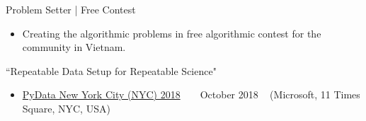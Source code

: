\begin{talks}

     \talk
	{Problem Setter | Free Contest}
	{
	\begin{itemize}[leftmargin=.4in]
	    \item Creating the algorithmic problems in free algorithmic contest for the community in Vietnam.
	\end{itemize}
	}
	
	\talk
	{``Repeatable Data Setup for Repeatable Science"}
	{
	\begin{itemize}[leftmargin=.4in]
	    \item \href{https://nlpwithfriends.com/}{PyData New York City (NYC) 2018} ~ \lbrack\href{https://pydata.org/nyc2018/schedule/presentation/14/}{\small{\websiteSymbol}}\rbrack ~
	    \lbrack\href{https://www.youtube.com/watch?v=eMtuzjn_Xks}{\small{\videoSymbol}}\rbrack
	    \hfill October 2018 ~ (Microsoft, 11 Times Square, NYC, USA)
	\end{itemize}
	}
\end{talks}    
\vspace{-3mm}

